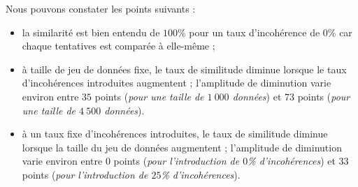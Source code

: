 			Nous pouvons constater les points suivants :
			\begin{itemize}
				\item la similarité est bien entendu de $100$\% pour un taux d'incohérence de $0$\% car chaque tentatives est comparée à elle-même ;
				\item à taille de jeu de données fixe, le taux de similitude diminue lorsque le taux d'incohérences introduites augmentent ;
				l'amplitude de diminution varie environ entre $35$ points (\textit{pour une taille de $1~000$ données}) et $73$ points (\textit{pour une taille de $4~500$ données}).
				\item à un taux fixe d'incohérences introduites, le taux de similitude diminue lorsque la taille du jeu de données augmentent ;
				l'amplitude de diminution varie environ entre $0$ points (\textit{pour l'introduction de $0$\% d'incohérences}) et $33$ points (\textit{pour l'introduction de $25$\% d'incohérences}).
			\end{itemize}
			
